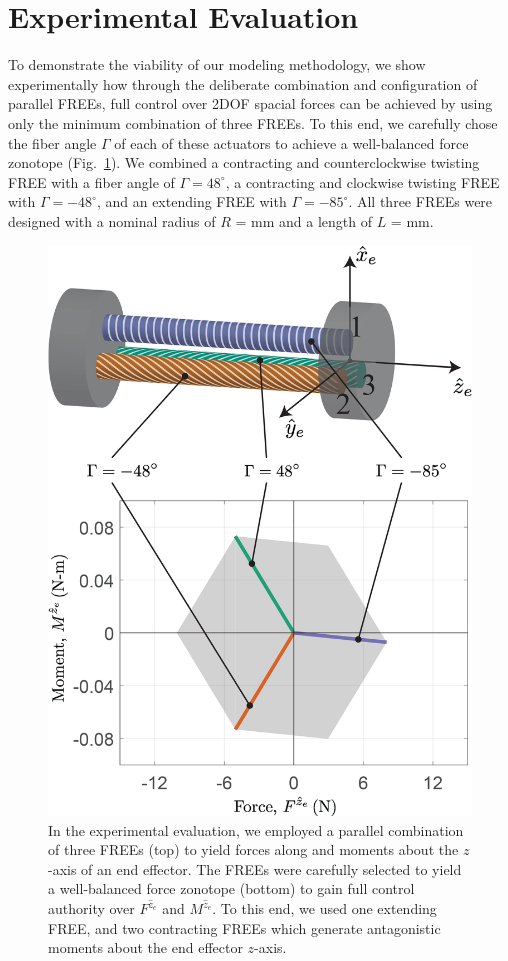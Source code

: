 \section{Experimental Evaluation}
\label{sec:experiment}
To demonstrate the viability of our modeling methodology, we show experimentally how through the deliberate combination and configuration of parallel FREEs, full control over 2DOF spacial forces can be achieved by using only the minimum combination of three FREEs.
To this end, we carefully chose the fiber angle $\Gamma$ of each of these actuators to achieve a well-balanced force zonotope (Fig.~\ref{fig:rigDiagram}).
We combined a contracting and counterclockwise twisting FREE with a fiber angle of $\Gamma = 48^\circ$, a contracting and clockwise twisting FREE with $\Gamma = -48^\circ$, and an extending FREE with $\Gamma = -85^\circ$.
All three FREEs were designed with a nominal radius of $R$ = \unit[5]{mm} and a length of $L$ = \unit[100]{mm}.
%
\begin{figure}
    \centering
    \includegraphics[width=0.75\linewidth]{figures/rigDiagram_wlabels10.png}
    \caption{In the experimental evaluation, we employed a parallel combination of three FREEs (top) to yield forces along and moments about the $z$-axis of an end effector.
    The FREEs were carefully selected to yield a well-balanced force zonotope (bottom) to gain full control authority over $F^{\hat{z}_e}$ and $M^{\hat{z}_e}$.
    To this end, we used one extending FREE, and two contracting FREEs which generate antagonistic moments about the end effector $z$-axis.}
    \label{fig:rigDiagram}
\end{figure}


